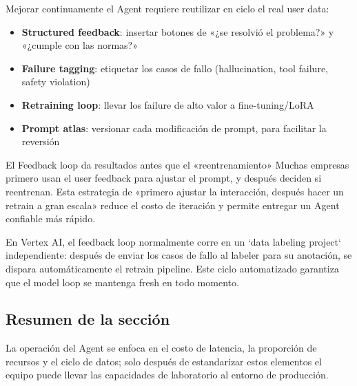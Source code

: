 Mejorar continuamente el Agent requiere reutilizar en ciclo el real user data:

\begin{itemize}
    \item \textbf{Structured feedback}: insertar botones de «¿se resolvió el problema?» y «¿cumple con las normas?»
    \item \textbf{Failure tagging}: etiquetar los casos de fallo (hallucination, tool failure, safety violation)
    \item \textbf{Retraining loop}: llevar los failure de alto valor a fine-tuning/LoRA
    \item \textbf{Prompt atlas}: versionar cada modificación de prompt, para facilitar la reversión
\end{itemize}

\begin{knowledgebox}{El Feedback loop da resultados antes que el «reentrenamiento»}
Muchas empresas primero usan el user feedback para ajustar el prompt, y después deciden si reentrenan. Esta estrategia de «primero ajustar la interacción, después hacer un retrain a gran escala» reduce el costo de iteración y permite entregar un Agent confiable más rápido.
\end{knowledgebox}

En Vertex AI, el feedback loop normalmente corre en un `data labeling project` independiente: después de enviar los casos de fallo al labeler para su anotación, se dispara automáticamente el retrain pipeline. Este ciclo automatizado garantiza que el model loop se mantenga fresh en todo momento.

\subsection{Resumen de la sección}

La operación del Agent se enfoca en el costo de latencia, la proporción de recursos y el ciclo de datos; solo después de estandarizar estos elementos el equipo puede llevar las capacidades de laboratorio al entorno de producción.

